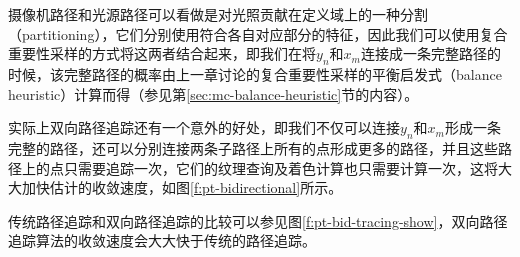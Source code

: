 摄像机路径和光源路径可以看做是对光照贡献在定义域上的一种分割（partitioning），它们分别使用符合各自对应部分的特征，因此我们可以使用复合重要性采样的方式将这两者结合起来，即我们在将$y_n$和$x_m$连接成一条完整路径的时候，该完整路径的概率由上一章讨论的复合重要性采样的平衡启发式（balance heuristic）计算而得（参见第\ref{sec:mc-balance-heuristic}节的内容）。

实际上双向路径追踪还有一个意外的好处，即我们不仅可以连接$y_n$和$x_m$形成一条完整的路径，还可以分别连接两条子路径上所有的点形成更多的路径，并且这些路径上的点只需要追踪一次，它们的纹理查询及着色计算也只需要计算一次，这将大大加快估计的收敛速度，如图\ref{f:pt-bidirectional}所示。

传统路径追踪和双向路径追踪的比较可以参见图\ref{f:pt-bid-tracing-show}，双向路径追踪算法的收敛速度会大大快于传统的路径追踪。

